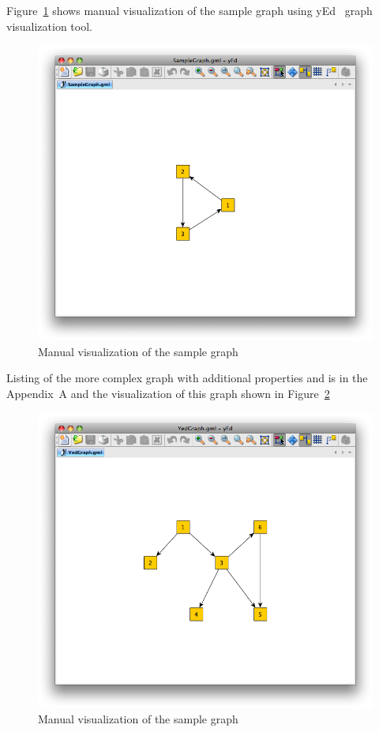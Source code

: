 Figure~\ref{fig:sample_graph_yed_vis} shows manual visualization of the sample graph using yEd~\cite{yed} graph visualization tool.

\begin{figure}[h!]
\centering
\includegraphics[scale=0.56]{pictures/SampleGraph.png}
\caption{Manual visualization of the sample graph}
\label{fig:sample_graph_yed_vis}
\end{figure}

Listing of the more complex graph with additional properties and is in the Appendix~A and the visualization of this graph shown in Figure~\ref{fig:yed_graph_vis}

\begin{figure}[h!]
\centering
\includegraphics[scale=0.56]{pictures/YedGraph.png}
\caption{Manual visualization of the sample graph}
\label{fig:yed_graph_vis}
\end{figure}

